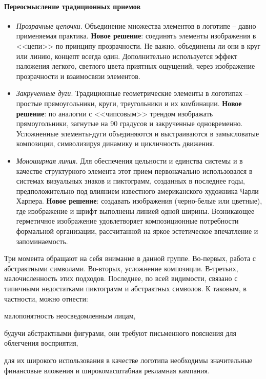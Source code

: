 \paragraph{Переосмысление традиционных приемов}
\begin{itemize}
\item \emph{Прозрачные цепочки}. Объединение множества элементов в логотипе -- давно применяемая
  практика. \textbf{Новое решение}: соединять элементы изображения в <<цепи>> по принципу
  прозрачности. Не важно, объединены ли они в круг или линию, концепт всегда один. Дополнительно
  используется эффект наложения легкого, светлого цвета приятных ощущений, через изображение
  прозрачности и взаимосвязи элементов.
\item \emph{Закрученные дуги}. Традиционные  геометрические элементы в логотипах -- простые
  прямоугольники, круги, треугольники и их комбинации. \textbf{Новое решение}: по аналогии с
  <<чипсовым>> трендом изображать  прямоугольники,  загнутые на 90 градусов и закрученные
  одновременно. Усложненные элементы-дуги объединяются и выстраиваются в замысловатые композиции,
  символизируя динамику и цикличность движения.
\item \emph{Моноширная линия}.  Для обеспечения цельности и единства системы и в качестве структурного
  элемента этот прием первоначально использовался в системах визуальных знаков и пиктограмм,
  созданных в последнее годы, предположительно под влиянием известного американского художника
  Чарли Харпера. \textbf{Новое решение}: создавать изображения  (черно-белые или цветные), где
  изображение и шрифт выполнены линией одной ширины. Возникающее герметичное изображение
  удовлетворяет композиционные потребности  формальной организации, рассчитанной на яркое
  эстетическое впечатление и запоминаемость.
\end{itemize}

Три момента обращают на себя внимание в данной группе. Во-первых, работа с абстрактными
символами. Во-вторых, усложнение композиции. В-третьих, малочисленность этих подходов. Последнее, по
всей видимости, связано с типичными недостатками пиктограмм и абстрактных символов. К таковым, в
частности, можно отнести:
\begin{enumerate*}[label=\asbuk*)]
\item малопонятность неосведомленным лицам,
\item будучи абстрактными фигурами, они требуют письменного пояснения для облегчения восприятия,
\item для их широкого использования в качестве логотипа необходимы значительные финансовые
  вложения и широкомасштабная рекламная кампания.
\end{enumerate*}

